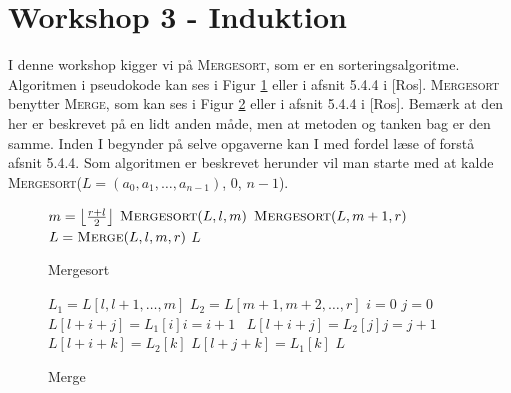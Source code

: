 \section{Workshop 3 - Induktion}
I denne workshop kigger vi på \textsc{Mergesort}, som er en sorteringsalgoritme. Algoritmen i pseudokode kan ses i Figur \ref{fig:Mergesort} eller i afsnit 5.4.4 i [Ros]. \textsc{Mergesort} benytter \textsc{Merge}, som kan ses i Figur \ref{fig:Merge} eller i afsnit 5.4.4 i [Ros]. Bemærk at den her er beskrevet på en lidt anden måde, men at metoden og tanken bag er den samme. Inden I begynder på selve opgaverne kan I med fordel læse of forstå afsnit 5.4.4. Som algoritmen er beskrevet herunder vil man starte med at kalde \textsc{Mergesort}($L=(a_0,a_1,\ldots,a_{n-1}) $, $0$, $n-1$).

\begin{figure}[h!]
    \begin{algorithmic}
                \State $m=\left\lfloor{\frac{r+l}{2}}\right\rfloor$
                \State $\textsc{Mergesort}(L, l, m)$
                \State $\textsc{Mergesort}(L, m+1, r)$
                \State $L= \textsc{Merge}(L, l, m,r)$
            \EndIf
		\Return $L$
		\EndProcedure
	\end{algorithmic}
	\caption{Mergesort}\label{fig:Mergesort}
\end{figure}

\begin{figure}[h!]
		\begin{algorithmic}
		\State $L_1=L[l,l+1,\ldots,m]$
		\State $L_2=L[m+1,m+2,\ldots,r]$
		\State $i=0$
		\State $j=0$
				 \State $L[l+i+j]=L_1[i]$\State $i=i+1$
				\Else ~$L[l+i+j]=L_2[j]$\State $j=j+1$
				\EndIf
			\EndWhile
			 \For{$k=j\ldots r-m-1$}
							\State$L[l+i+k]=L_2[k]$
						\EndFor
			\Else \For{$k=i\ldots m-l$}
							\State$L[l+j+k]=L_1[k]$
						\EndFor
			\EndIf
			\Return $L$
		\EndProcedure
	\end{algorithmic}
	\caption{Merge}\label{fig:Merge}
\end{figure}
